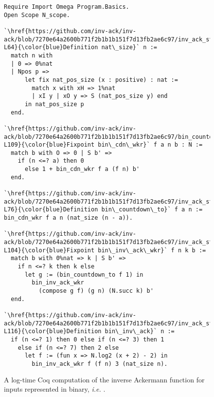 \begin{figure}
\lstset{style=myTinyStyle}
\begin{lstlisting}
Require Import Omega Program.Basics.
Open Scope N_scope.

`\href{https://github.com/inv-ack/inv-ack/blob/7270e64a2600b771f2b1b1b151f7d13fb2ae6c97/inv_ack_standalone.v#L56-L64}{\color{blue}Definition nat\_size}` n :=
  match n with
  | 0 => 0%nat
  | Npos p =>
      let fix nat_pos_size (x : positive) : nat :=
        match x with xH => 1%nat
        | xI y | xO y => S (nat_pos_size y) end
      in nat_pos_size p
  end.

`\href{https://github.com/inv-ack/inv-ack/blob/7270e64a2600b771f2b1b1b151f7d13fb2ae6c97/bin_countdown.v#L104-L109}{\color{blue}Fixpoint bin\_cdn\_wkr}` f a n b : N :=
  match b with O => 0 | S b' =>
    if (n <=? a) then 0
      else 1 + bin_cdn_wkr f a (f n) b'
  end.

`\href{https://github.com/inv-ack/inv-ack/blob/7270e64a2600b771f2b1b1b151f7d13fb2ae6c97/inv_ack_standalone.v#L75-L76}{\color{blue}Definition bin\_countdown\_to}` f a n := 
bin_cdn_wkr f a n (nat_size (n - a)).

`\href{https://github.com/inv-ack/inv-ack/blob/7270e64a2600b771f2b1b1b151f7d13fb2ae6c97/inv_ack_standalone.v#L97-L104}{\color{blue}Fixpoint bin\_inv\_ack\_wkr}` f n k b :=
  match b with 0%nat => k | S b' => 
    if n <=? k then k else 
      let g := (bin_countdown_to f 1) in
        bin_inv_ack_wkr
          (compose g f) (g n) (N.succ k) b'
  end.

`\href{https://github.com/inv-ack/inv-ack/blob/7270e64a2600b771f2b1b1b151f7d13fb2ae6c97/inv_ack_standalone.v#L111-L116}{\color{blue}Definition bin\_inv\_ack}` n :=
  if (n <=? 1) then 0 else if (n <=? 3) then 1
    else if (n <=? 7) then 2 else 
      let f := (fun x => N.log2 (x + 2) - 2) in
        bin_inv_ack_wkr f (f n) 3 (nat_size n).
\end{lstlisting}
\caption{A log-time Coq computation of the inverse Ackermann function for inputs represented in binary, \emph{i.e.} .}
\label{fig:standalone_binary}
\end{figure}
\lstset{style=myStyle}

